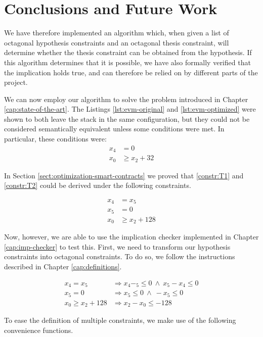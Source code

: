 \chapter{Conclusions and Future Work}
\label{cap:conclusions}

We have therefore implemented an algorithm which, when given a list of octagonal
hypothesis constraints and an octagonal thesis constraint, will determine whether
the thesis constraint can be obtained from the hypothesis. If this algorithm
determines that it is possible, we have also formally verified that the implication
holds true, and can therefore be relied on by different parts of the project.

We can now employ our algorithm to solve the problem introduced in Chapter
\ref{cap:state-of-the-art}. The Listings \ref{lst:evm-original} and \ref{lst:evm-optimized}
were shown to both leave the stack in the same configuration, but they could
not be considered semantically equivalent unless some conditions were met. In
particular, these conditions were:
\begin{align}
    \label{constr:T1} x_4 &= 0 \\
    \label{constr:T2} x_0 &\ge x_2 + 32
\end{align}

In Section \ref{sect:optimization-smart-contracts} we proved that \ref{constr:T1} and \ref{constr:T2} could be derived under the following constraints.

\begin{align*}
    x_4 &= x_5 \\
    x_5 &= 0 \\
    x_0 &\ge x_2 + 128
\end{align*}

Now, however, we are able to use the implication checker implemented in Chapter
\ref{cap:imp-checker} to test this. First, we need to transform our hypothesis
constraints into octagonal constraints. To do so, we follow the instructions
described in Chapter \ref{cap:definitions}.

\begin{align*}
    x_4 = x_5 &\Longrightarrow x_4 - _5 \le 0 \ \wedge\  x_5 - x_4 \le 0
    \\
    x_5 = 0 &\Longrightarrow x_5 \le 0 \ \wedge\ -x_5 \le 0
    \\
    x_0 \ge x_2 + 128 &\Longrightarrow x_2 - x_0 \le -128
\end{align*}

To ease the definition of multiple constraints, we make use of the following
convenience functions.

